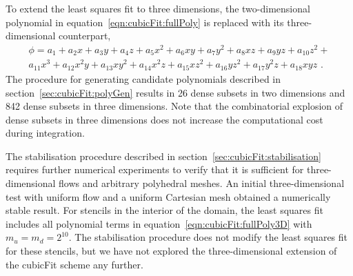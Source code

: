 To extend the least squares fit to three dimensions, the two-dimensional polynomial in equation~\eqref{eqn:cubicFit:fullPoly} is replaced with its three-dimensional counterpart,
\begin{multline}
	\phi = a_1 + a_2 x + a_3 y + a_4 z + a_5 x^2 + a_6 xy + a_7 y^2 + a_8 xz + a_9 yz + a_{10} z^2 + \\ a_{11} x^3 + a_{12} x^2 y + a_{13} x y^2 + a_{14} x^2 z + a_{15} x z^2 + a_{16} y z^2 + a_{17} y^2 z + a_{18} xyz \text{ .} \label{eqn:cubicFit:fullPoly3D}
\end{multline}
The procedure for generating candidate polynomials described in section~\ref{sec:cubicFit:polyGen} results in 26 dense subsets in two dimensions and 842 dense subsets in three dimensions.  Note that the combinatorial explosion of dense subsets in three dimensions does not increase the computational cost during integration.

The stabilisation procedure described in section~\ref{sec:cubicFit:stabilisation} requires further numerical experiments to verify that it is sufficient for three-dimensional flows and arbitrary polyhedral meshes.
An initial three-dimensional test with uniform flow and a uniform Cartesian mesh obtained a numerically stable result.
For stencils in the interior of the domain, the least squares fit includes all polynomial terms in equation~\eqref{eqn:cubicFit:fullPoly3D} with $m_u = m_d = 2^{10}$.
The stabilisation procedure does not modify the least squares fit for these stencils, but we have not explored the three-dimensional extension of the cubicFit scheme any further.

